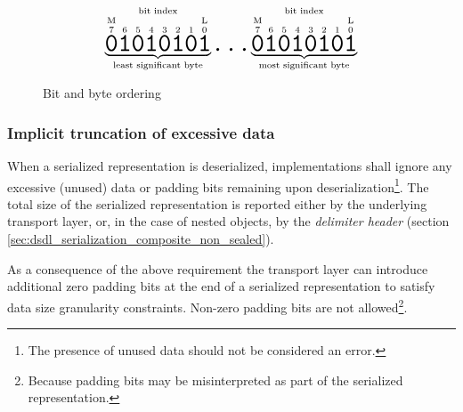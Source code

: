 \begin{figure}[H]
    $$
    \overset{\text{bit index}}{%
        \underbrace{%
            \overset{\text{M}}{\overset{7}{\hugett{0}}}
            \overset{6}{\hugett{1}}
            \overset{5}{\hugett{0}}
            \overset{4}{\hugett{1}}
            \overset{3}{\hugett{0}}
            \overset{2}{\hugett{1}}
            \overset{1}{\hugett{0}}
            \overset{\text{L}}{\overset{0}{\hugett{1}}}
        }_\text{least significant byte}%
    }
    \hugett{\ldots}
    \overset{\text{bit index}}{%
        \underbrace{%
            \overset{\text{M}}{\overset{7}{\hugett{0}}}
            \overset{6}{\hugett{1}}
            \overset{5}{\hugett{0}}
            \overset{4}{\hugett{1}}
            \overset{3}{\hugett{0}}
            \overset{2}{\hugett{1}}
            \overset{1}{\hugett{0}}
            \overset{\text{L}}{\overset{0}{\hugett{1}}}
        }_\text{most significant byte}%
    }
    $$
    \caption{Bit and byte ordering\label{fig:dsdl_serialization_bit_ordering}}
\end{figure}

\subsubsection{Implicit truncation of excessive data}\label{sec:dsdl_serialization_implicit_truncation}

When a serialized representation is deserialized, implementations shall ignore
any excessive (unused) data or padding bits remaining upon deserialization\footnote{%
    The presence of unused data should not be considered an error.
}.
The total size of the serialized representation is reported either by the underlying transport layer, or,
in the case of nested objects, by the \emph{delimiter header}
(section \ref{sec:dsdl_serialization_composite_non_sealed}).

As a consequence of the above requirement the transport layer can introduce
additional zero padding bits at the end of a serialized representation
to satisfy data size granularity constraints.
Non-zero padding bits are not allowed\footnote{%
    Because padding bits may be misinterpreted as part of the serialized representation.
}.

